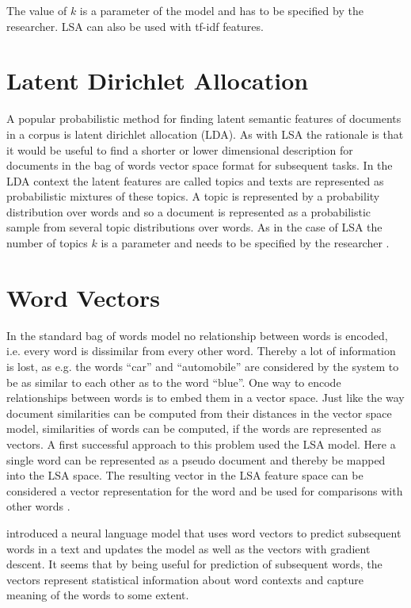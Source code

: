 \documentclass[Thesis.tex]{subfiles}
\begin{document}
The value of $k$ is a parameter of the model and has to be specified
by the researcher. LSA can also be used with tf-idf features.


\section{Latent Dirichlet Allocation}

A popular probabilistic method for finding latent semantic features
of documents in a corpus is latent dirichlet allocation (LDA). As
with LSA the rationale is that it would be useful to find a shorter
or lower dimensional description for documents in the bag of words
vector space format for subsequent tasks. In the LDA context the latent
features are called topics and texts are represented as probabilistic
mixtures of these topics. A topic is represented by a probability
distribution over words and so a document is represented as a probabilistic
sample from several topic distributions over words. As in the case of LSA the
number of topics $k$ is a parameter and needs to be specified by
the researcher \citep{Blei2003}. 


\section{Word Vectors}

In the standard bag of words model no relationship between words is
encoded, i.e. every word is dissimilar from every other word. Thereby
a lot of information is lost, as e.g. the words ``car'' and ``automobile''
are considered by the system to be as similar to each other as to
the word ``blue''. One way to encode relationships between words
is to embed them in a vector space. Just like the way document similarities
can be computed from their distances in the vector space model, similarities
of words can be computed, if the words are represented as vectors.
A first successful approach to this problem used the LSA model. Here
a single word can be represented as a pseudo document and thereby
be mapped into the LSA space. The resulting vector in the LSA feature
space can be considered a vector representation for the word and be
used for comparisons with other words \citep{Deerwester1990}.

\citet{Bengio2003} introduced a neural language model that uses
word vectors to predict subsequent words in a text and updates the
model as well as the vectors with gradient descent. It seems that
by being useful for prediction of subsequent words, the vectors represent
statistical information about word contexts and capture meaning of
the words to some extent.
\end{document}
